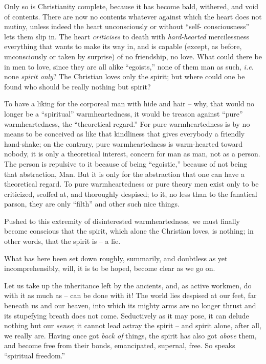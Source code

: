 \documentclass[12pt,a4paper]{book}
\begin{document}
Only so is Christianity complete, because it has become bald, withered, and 
void of contents. There are now no contents whatever against which the heart 
does not mutiny, unless indeed the heart unconsciously or without ``self- 
consciousness'' lets them slip in. The heart \textit{criticises} to death 
with \textit{hard-hearted} mercilessness everything that wants to make its way 
in, and is capable (except, as before, unconsciously or taken by surprise) of 
no friendship, no love. What could there be in men to love, since they are all 
alike ``egoists,'' none of them man as such, \textit{i.e.} none 
\textit{spirit only}? The Christian loves only the spirit; but where could one 
be found who should be really nothing but spirit?

To have a liking for the corporeal man with hide and hair -- why, that would 
no longer be a ``spiritual'' warmheartedness, it would be treason against 
``pure'' warmheartedness, the ``theoretical regard.'' For pure 
warmheartedness is by no means to be conceived as like that kindliness that 
gives everybody a friendly hand-shake; on the contrary, pure warmheartedness 
is warm-hearted toward nobody, it is only a theoretical interest, concern for 
man as man, not as a person. The person is repulsive to it because of being 
``egoistic,'' because of not being that abstraction, Man. But it is only for 
the abstraction that one can have a theoretical regard. To pure 
warmheartedness or pure theory men exist only to be criticized, scoffed at, 
and thoroughly despised; to it, no less than to the fanatical parson, they are 
only ``filth'' and other such nice things.

Pushed to this extremity of disinterested warmheartedness, we must finally 
become conscious that the spirit, which alone the Christian loves, is nothing; 
in other words, that the spirit is -- a lie.

What has here been set down roughly, summarily, and doubtless as yet 
incomprehensibly, will, it is to be hoped, become clear as we go on.

Let us take up the inheritance left by the ancients, and, as active workmen, 
do with it as much as -- can be done with it! The world lies despised at our 
feet, far beneath us and our heaven, into which its mighty arms are no longer 
thrust and its stupefying breath does not come. Seductively as it may pose, it 
can delude nothing but our \textit{sense}; it cannot lead astray the spirit -- 
and spirit alone, after all, we really are. Having once got \textit{back of} 
things, the spirit has also got \textit{above} them, and become free from 
their bonds, emancipated, supernal, free. So speaks ``spiritual freedom.''
\end{document}
